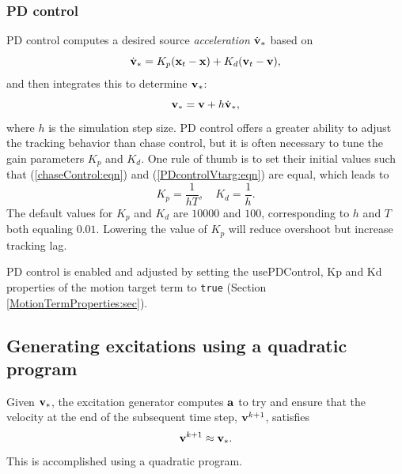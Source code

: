 \subsubsection{PD control}
\label{PDControl:sec}

PD control computes a desired source {\it acceleration} $\dot{{\bf v}}_*$ based on
%
\begin{equation}
\dot{{\bf v}}_* = K_p ({\bf x}_t - {\bf x}) + K_d ({\bf v}_t - {\bf v}),
\label{PDcontrol:eqn}
\end{equation}
%
and then integrates this to determine ${\bf v}_*$:
%
\begin{equation}
{\bf v}_* = {\bf v} + h \dot{{\bf v}}_*,
\label{PDcontrolVtarg:eqn}
\end{equation}
%
where $h$ is the simulation step size. PD control offers a greater ability to
adjust the tracking behavior than chase control, but it is often necessary to
tune the gain parameters $K_p$ and $K_d$. One rule of thumb is to
set their initial values such that (\ref{chaseControl:eqn}) and
(\ref{PDcontrolVtarg:eqn}) are equal, which leads to
%
\begin{equation*}
K_p = \frac{1}{h T}, \quad K_d = \frac{1}{h}.
\end{equation*}
%
The default values for $K_p$ and $K_d$ are $10000$ and $100$, corresponding to
$h$ and $T$ both equaling $0.01$. Lowering the value of $K_p$ will reduce
overshoot but increase tracking lag.

PD control is enabled and adjusted by setting the {\sf usePDControl}, {\sf Kp}
and {\sf Kd} properties of the motion target term to {\tt true}
(Section \ref{MotionTermProperties:sec}).

\subsection{Generating excitations using a quadratic program}
\label{GeneratingExcitations:sec}

Given ${\bf v}_*$, the excitation generator computes ${\bf a}$ to try and ensure that the
velocity at the end of the subsequent time step, ${\bf v}^{k+1}$, satisfies
%
\begin{equation}
{\bf v}^{k+1} \approx {\bf v}_*.
\label{vtrack:eqn}
\end{equation}
%
This is accomplished using a quadratic program.

